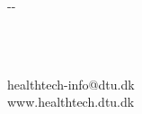 \thispagestyle{empty}


\begin{adjustwidth*}{}{-\marginparsep- \marginparwidth}

\hfill
\vfill






{\normalsize \sffamily
    \\
    \myFaculty \\
    \myUni
    
    \bigskip
    \noindent \myAddress
    
    \bigskip
    \noindent healthtech-info@dtu.dk\\www.healthtech.dtu.dk
}



\end{adjustwidth*}
\frieze

